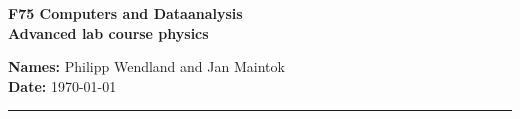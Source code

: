\begin{centering}
  \LARGE{\textbf{F75 Computers and Dataanalysis\\ Advanced lab course physics}}\\
  \vspace*{20pt}

\normalsize{\textbf{Names:} Philipp Wendland and Jan Maintok} \\
\textbf{Date: } \today \\
 
 \end{centering}

 \vspace*{10pt}

 \rule{\textwidth}{1pt}

